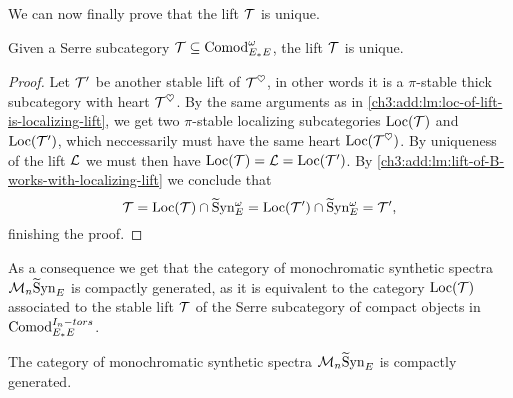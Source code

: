 We can now finally prove that the lift $\mathcal{T}$ is unique. 

\begin{theorem}
    \label{ch3:add:thm:uniqueness-of-lift}
    Given a Serre subcategory $\mathcal{T}\subseteq \mathrm{Comod}_{E_*E}^\omega$, the lift $\mathcal{T}$ is unique. 
\end{theorem}
\begin{proof}
    Let $\mathcal{T}'$ be another stable lift of $\mathcal{T}^\heartsuit$, in other words it is a $\pi$-stable thick subcategory with heart $\mathcal{T}^\heartsuit$. By the same arguments as in \cref{ch3:add:lm:loc-of-lift-is-localizing-lift}, we get two $\pi$-stable localizing subcategories $\operatorname{Loc}(\mathcal{T})$ and $\operatorname{Loc}(\mathcal{T}')$, which neccessarily must have the same heart $\operatorname{Loc}(\mathcal{T}^\heartsuit)$. By uniqueness of the lift $\mathcal{L}$ we must then have $\operatorname{Loc}(\mathcal{T}) = \mathcal{L} = \operatorname{Loc}(\mathcal{T}')$. By \cref{ch3:add:lm:lift-of-B-works-with-localizing-lift} we conclude that 
    \[\mathcal{T} = \operatorname{Loc}(\mathcal{T})\cap \widetilde{\mathrm{S}}\mathrm{yn}_{E}^\omega = \operatorname{Loc}(\mathcal{T}')\cap \widetilde{\mathrm{S}}\mathrm{yn}_{E}^\omega = \mathcal{T}',\]
    finishing the proof. 
\end{proof}

As a consequence we get that the category of monochromatic synthetic spectra $\mathcal{M}_{n}\widetilde{\mathrm{S}}\mathrm{yn}_{E}$ is compactly generated, as it is equivalent to the category $\operatorname{Loc}(\mathcal{T})$ associated to the stable lift $\mathcal{T}$ of the Serre subcategory of compact objects in $\mathrm{Comod}_{E_*E}^{I_n-tors}$. 

\begin{corollary}
    The category of monochromatic synthetic spectra $\mathcal{M}_{n}\widetilde{\mathrm{S}}\mathrm{yn}_{E}$ is compactly generated. 
\end{corollary}




